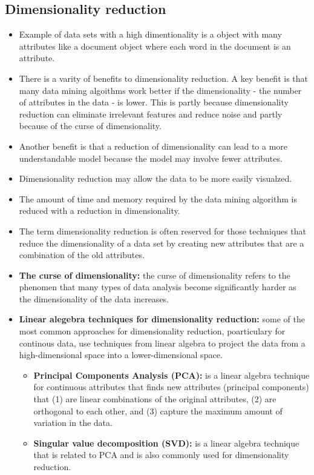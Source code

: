 	\subsection*{Dimensionality reduction}
		\begin{itemize}
			\item Example of data sets with a high dimentionality is a object with many
			attributes like a document object where each word in the document is an 
			attribute. 
			\item There is a varity of benefits to dimensionality reduction. A key benefit 
			is that many data mining algoithms work better if the dimensionality - 
			the number of attributes in the data - is lower. This is partly because 
			dimensionality reduction can eliminate irrelevant features and reduce noise and
			partly because of the curse of dimensionality.
			\item Another benefit is that a reduction of dimensionality can lead to a more
			understandable model because the model may involve fewer attributes.
			\item Dimensionality reduction may allow the data to be more easily visualzed.
			\item The amount of time and memory required by the data mining algorithm is reduced 
			with a reduction in dimensionality. 
			\item The term dimensionality reduction is often reserved for those techniques
			that reduce the dimensionality of a data set by creating new attributes that
			are a combination of the old attributes. 
			\item {\bf The curse of dimensionality:} the curse of dimensionality refers
			to the phenomen that many types of data analysis become significantly harder
			as the dimensionality of the data increases. 
			\item {\bf Linear alegebra techniques for dimensionality reduction:} some
			of the most common approaches for dimensionality reduction, poarticulary for
			continous data, use techniques from linear algebra to project the data from a 
			high-dimensional space into a lower-dimensional space. 
				\begin{itemize}
					\item {\bf Principal Components Analysis (PCA):} is a linear algebra technique 
					for continuous attributes that finds new attributes (principal components)
					that (1) are linear combinations of the original attributes, 
					(2) are orthogonal to each other, and (3) capture the maximum amount of 
					variation in the data. 
					\item {\bf Singular value decomposition (SVD): } is a linear algebra
					technique that is related to PCA and is also commonly used for
					dimensionality reduction.
				\end{itemize}
		\end{itemize}

